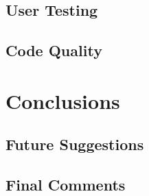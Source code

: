 \documentclass[msc,deptreport, cs]{infthesis}
\begin{document}
\section{User Testing}

\section{Code Quality}

\chapter{Conclusions}

\section{Future Suggestions}

\section{Final Comments}



\end{document}
